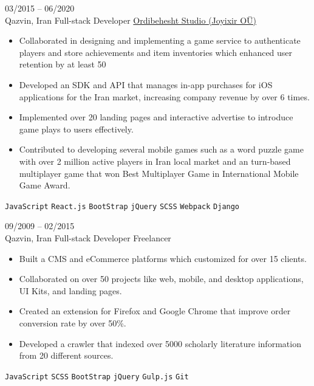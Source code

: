 \documentclass[8pt]{developercv} %
\begin{document}
\begin{entrylist}
        \entry
        {03/2015 -- 06/2020 \\ Qazvin, Iran}
        {Full-stack Developer}
        {\href{https://www.joyixir.com/}{Ordibehesht Studio  (Joyixir OÜ)}}
        {\vspace{-10pt}
            \begin{itemize}[noitemsep,topsep=0pt,parsep=0pt,partopsep=0pt, leftmargin=-1pt]
                \item Collaborated in designing and implementing a game service to authenticate players and store achievements and item inventories which enhanced user retention by at least 50%
                \item Developed an SDK and API that manages in-app purchases for iOS applications for the Iran market, increasing company revenue by over 6 times.
                \item Implemented over 20 landing pages and interactive advertise to introduce game plays to users effectively.
                \item Contributed to developing several mobile games such as a word puzzle game with over 2 million active players in Iran local market and an turn-based multiplayer game that won Best Multiplayer Game in International Mobile Game Award.
            \end{itemize}
            \texttt{JavaScript} \slashsep \texttt{React.js} \slashsep \texttt{BootStrap} \slashsep \texttt{jQuery} \slashsep \texttt{SCSS} \slashsep \texttt{Webpack} \slashsep \texttt{Django}
        }

        \entry
        {09/2009 -- 02/2015 \\ Qazvin, Iran}
        {Full-stack Developer}
        {Freelancer}
        {\vspace{-10pt}
            \begin{itemize}[noitemsep,topsep=0pt,parsep=0pt,partopsep=0pt, leftmargin=-1pt]
                \item Built a CMS and eCommerce platforms which customized for over 15 clients.
                \item Collaborated on over 50 projects like web, mobile, and desktop applications, UI Kits, and landing pages.
                \item Created an extension for Firefox and Google Chrome that improve order conversion rate by over 50\%.
                \item Developed a crawler that indexed over 5000 scholarly literature information from 20 different sources.
            \end{itemize}
            \texttt{JavaScript} \slashsep \texttt{SCSS} \slashsep \texttt{BootStrap} \slashsep \texttt{jQuery} \slashsep \texttt{Gulp.js} \slashsep \texttt{Git}
        }
    \end{entrylist}
\end{document}
